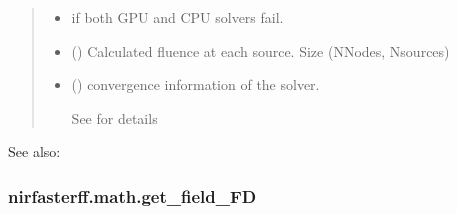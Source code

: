\documentclass[letterpaper,10pt,english]{sphinxmanual}
\begin{document}
\begin{fulllineitems}
\begin{quote}
\begin{description}
\begin{itemize}
\item {} 
\sphinxAtStartPar
{} \textendash{} if both GPU and CPU solvers fail.

\end{itemize}

\sphinxAtStartPar
\begin{itemize}
\item {} 
\sphinxAtStartPar
{} () \textendash{} Calculated fluence at each source. Size (NNodes, Nsources)

\item {} 
\sphinxAtStartPar
{} () \textendash{} convergence information of the solver.

\sphinxAtStartPar
See {\hyperref[\detokenize{_autosummary/nirfasterff.utils.ConvergenceInfo:nirfasterff.utils.ConvergenceInfo}]{}} for details

\end{itemize}


\end{description}\end{quote}


\begin{sphinxseealso}{See also:}

\sphinxAtStartPar
{\hyperref[\detokenize{_autosummary/nirfasterff.math.gen_mass_matrix:nirfasterff.math.gen_mass_matrix}]{}}


\end{sphinxseealso}


\end{fulllineitems}


\sphinxstepscope


\subsubsection{nirfasterff.math.get\_field\_FD}
\label{\detokenize{_autosummary/nirfasterff.math.get_field_FD:nirfasterff-math-get-field-fd}}\label{\detokenize{_autosummary/nirfasterff.math.get_field_FD::doc}}
\end{document}
